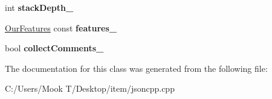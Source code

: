 \begin{DoxyCompactItemize}
\item 
\hypertarget{class_json_1_1_our_reader_aaa91c93bc064c7086248ea01eddcf51a}{}int {\bfseries stack\+Depth\+\_\+}\label{class_json_1_1_our_reader_aaa91c93bc064c7086248ea01eddcf51a}

\item 
\hypertarget{class_json_1_1_our_reader_a2714302d5cc54ca2ce4118ea51c0397a}{}\hyperlink{class_json_1_1_our_features}{Our\+Features} const {\bfseries features\+\_\+}\label{class_json_1_1_our_reader_a2714302d5cc54ca2ce4118ea51c0397a}

\item 
\hypertarget{class_json_1_1_our_reader_a259f6ac988da2894bcafc670e42f73ad}{}bool {\bfseries collect\+Comments\+\_\+}\label{class_json_1_1_our_reader_a259f6ac988da2894bcafc670e42f73ad}

\end{DoxyCompactItemize}


The documentation for this class was generated from the following file\+:\begin{DoxyCompactItemize}
\item 
C\+:/\+Users/\+Mook T/\+Desktop/item/jsoncpp.\+cpp\end{DoxyCompactItemize}
